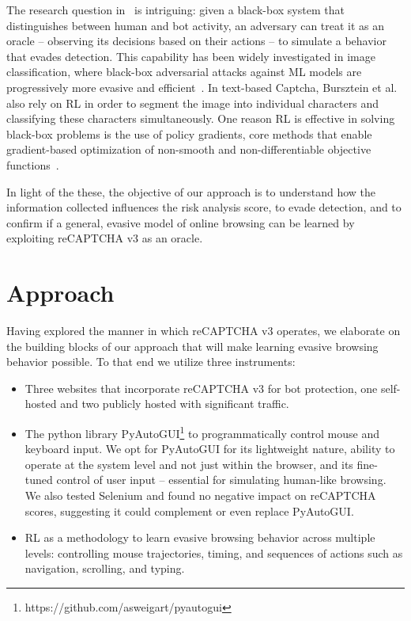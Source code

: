 The research question in~\cite{akrout2019hacking} is intriguing: given a black-box system that distinguishes between human and bot activity, an adversary can treat it as an oracle -- observing its decisions based on their actions -- to simulate a behavior that evades detection.
This capability has been widely investigated in image classification, where black-box adversarial attacks against \gls{ML} models are progressively more evasive and efficient~\cite{brendel2017decision, ilyas2018prior}.
In text-based Captcha, Bursztein et al.~\cite{bursztein2014end} also rely on \gls{RL} in order to segment the image into individual characters and classifying these characters simultaneously.
One reason \gls{RL} is effective in solving black-box problems is the use of policy gradients, core methods that enable gradient-based optimization of non-smooth and non-differentiable objective functions~\cite{sutton1999policy}.

In light of the these, the objective of our approach is to understand how the information collected influences the risk analysis score, to evade detection, and to confirm if a general, evasive model of online browsing can be learned by exploiting reCAPTCHA v3 as an oracle.

\section{Approach}
\label{sec:approachre}

Having explored the manner in which reCAPTCHA v3 operates, we elaborate on the building blocks of our approach that will make learning evasive browsing behavior possible.
To that end we utilize three instruments:
\begin{itemize}
  \item Three websites that incorporate reCAPTCHA v3 for bot protection, one self-hosted and two publicly hosted with significant traffic.
  \item The python library PyAutoGUI\footnote{https://github.com/asweigart/pyautogui} to programmatically control mouse and keyboard input.
  We opt for PyAutoGUI for its lightweight nature, ability to operate at the system level and not just within the browser, and its fine-tuned control of user input -- essential for simulating human-like browsing.
  We also tested Selenium and found no negative impact on reCAPTCHA scores, suggesting it could complement or even replace PyAutoGUI.
  \item \gls{RL} as a methodology to learn evasive browsing behavior across multiple levels: controlling mouse trajectories, timing, and sequences of actions such as navigation, scrolling, and typing.
\end{itemize}

